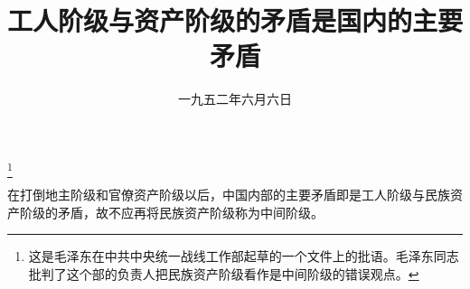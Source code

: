 
\title{工人阶级与资产阶级的矛盾是国内的主要矛盾}
\date{一九五二年六月六日}
\thanks{这是毛泽东在中共中央统一战线工作部起草的一个文件上的批语。毛泽东同志批判了这个部的负责人把民族资产阶级看作是中间阶级的错误观点。}
\maketitle


在打倒地主阶级和官僚资产阶级以后，中国内部的主要矛盾即是工人阶级与民族资产阶级的矛盾，故不应再将民族资产阶级称为中间阶级。

